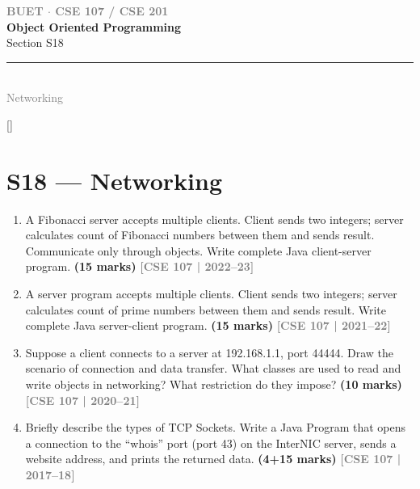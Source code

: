 \documentclass[12pt,a3paper]{article}
\newcommand{\yr}[1]{\hfill\textcolor{gray}{\small\textbf{[#1]}}}
\newcommand{\mk}[1]{\textcolor{orange!70!black}{\small\textbf{(#1 marks)}}}
\newcommand{\secdivider}[4]{%
  \newpage\thispagestyle{empty}%
  \vspace*{\fill}%
  \begin{tcolorbox}[enhanced,colback=#4!7,colframe=#3,boxrule=1.5pt,arc=8pt,
    left=20pt,right=20pt,top=22pt,bottom=22pt,
    shadow={3pt}{-3pt}{0pt}{black!15}]
    \centering
    {\large\textcolor{gray}{\textbf{BUET $\cdot$ CSE 107 / CSE 201}}}\\[8pt]
    {\fontsize{26}{32}\selectfont\bfseries\textcolor{#3}{Object Oriented Programming}}\\[6pt]
    {\fontsize{15}{19}\selectfont\textcolor{dgray}{#1}}\\[12pt]
    \textcolor{#3!60}{\rule{0.5\textwidth}{0.5pt}}\\[6pt]
    {\small\textcolor{gray}{#2}}
  \end{tcolorbox}%
  \vspace*{\fill}\newpage%
}
\begin{document}
\secdivider{Section S18}{Networking}{cB}{cB}
\label{sec:S18}
\titleformat{\section}{\large\bfseries\color{cB}}{}{0em}{}[\titlerule]
\section{S18 --- Networking}

\begin{enumerate}
\item A Fibonacci server accepts multiple clients. Client sends two integers; server calculates count of Fibonacci numbers between them and sends result. Communicate only through objects. Write complete Java client-server program. \mk{15}
\yr{CSE 107 | 2022--23}




\item A server program accepts multiple clients. Client sends two integers; server calculates count of prime numbers between them and sends result. Write complete Java server-client program. \mk{15}
\yr{CSE 107 | 2021--22}




\item Suppose a client connects to a server at 192.168.1.1, port 44444. Draw the scenario of connection and data transfer. What classes are used to read and write objects in networking? What restriction do they impose? \mk{10}
\yr{CSE 107 | 2020--21}



\item Briefly describe the types of TCP Sockets. Write a Java Program that opens a connection to the ``whois'' port (port 43) on the InterNIC server, sends a website address, and prints the returned data. \mk{4+15}
\yr{CSE 107 | 2017--18}





\end{enumerate}
\end{document}
